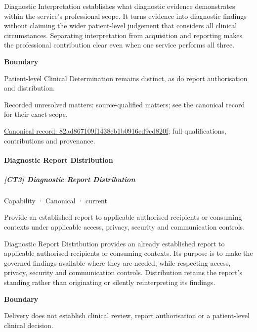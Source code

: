 Diagnostic Interpretation establishes what diagnostic evidence demonstrates within the service's professional scope. It turns evidence into diagnostic findings without claiming the wider patient-level judgement that considers all clinical circumstances. Separating interpretation from acquisition and reporting makes the professional contribution clear even when one service performs all three.



\textbf{Boundary}



Patient-level Clinical Determination remains distinct, as do report authorisation and distribution.


{\small Recorded unresolved matters: source-qualified matters; see the canonical record for their exact scope.}\par
{\footnotesize \href{../../../../continuum/strategy/capability/82ad867109f1438eb1b0916ed9cd820f.md}{Canonical record: 82ad867109f1438eb1b0916ed9cd820f}; full qualifications, contributions and provenance.}\par
\paragraph{Diagnostic Report Distribution}

\subparagraph{[CT3] Diagnostic Report Distribution}

\label{element:c8fdba3d18e143acb2bd77ae828afd4b}
{\small Capability · Canonical · current}\par

Provide an established report to applicable authorised recipients or consuming contexts under applicable access, privacy, security and communication controls.



Diagnostic Report Distribution provides an already established report to applicable authorised recipients or consuming contexts. Its purpose is to make the governed findings available where they are needed, while respecting access, privacy, security and communication controls. Distribution retains the report's standing rather than originating or silently reinterpreting its findings.



\textbf{Boundary}



Delivery does not establish clinical review, report authorisation or a patient-level clinical decision.


